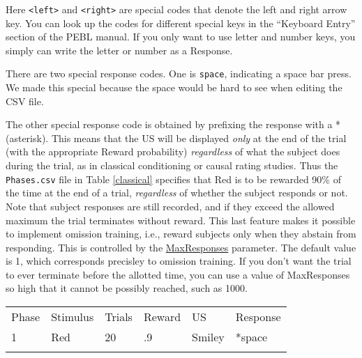 \documentclass[11pt,]{article}
\renewcommand{\medskip}{}
\begin{document}
Here \texttt{\textless{}left\textgreater{}} and
\texttt{\textless{}right\textgreater{}} are special codes that denote
the left and right arrow key. You can look up the codes for different
special keys in the ``Keyboard Entry'' section of the PEBL manual. If
you only want to use letter and number keys, you simply can write the
letter or number as a Response.

There are two special response codes. One is \texttt{space}, indicating
a space bar press. We made this special because the space would be hard
to see when editing the CSV file.

The other special response code is obtained by prefixing the response
with a * (asterisk). This means that the US will be displayed
\emph{only} at the end of the trial (with the appropriate Reward
probability) \emph{regardless} of what the subject does during the
trial, as in classical conditioning or causal rating studies. Thus the
\texttt{Phases.csv} file in Table \ref{classical} specifies that Red is
to be rewarded 90\% of the time at the end of a trial, \emph{regardless}
of whether the subject responds or not. Note that subject responses are
still recorded, and if they exceed the allowed maximum the trial
terminates without reward. This last feature makes it possible to
implement omission training, i.e., reward subjects only when they
abstain from responding. This is controlled by the
\hyperref[maxresponses]{MaxResponses} parameter. The default value is 1,
which corresponds precisley to omission training. If you don't want the
trial to ever terminate before the allotted time, you can use a value of
MaxResponses so high that it cannot be possibly reached, such as 1000.

\begin{table*}[t]\begin{center}\small\begin{tabular}{@{}llllll@{}}
\hline\noalign{\medskip}
Phase & Stimulus & Trials & Reward & US & Response
\\\noalign{\medskip}
\hline\noalign{\medskip}
1 & Red & 20 & .9 & Smiley & *space
\\\noalign{\medskip}
\hline
\noalign{\medskip}
\end{tabular}\caption{A \texttt{Phases.csv} file using the Response notation *space
to indicate a classical conditioning trial in which the US is delivered
at the end of the trial regardless of subject behavior.
\label{classical}}
\end{center}\end{table*}
\end{document}
